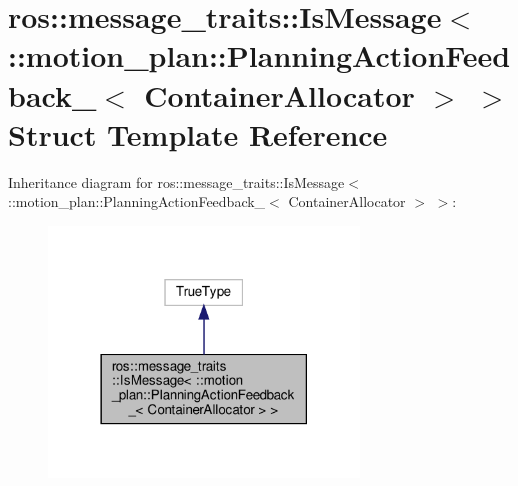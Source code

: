 \hypertarget{structros_1_1message__traits_1_1IsMessage_3_01_1_1motion__plan_1_1PlanningActionFeedback___3_01ContainerAllocator_01_4_01_4}{}\section{ros\+:\+:message\+\_\+traits\+:\+:Is\+Message$<$ \+:\+:motion\+\_\+plan\+:\+:Planning\+Action\+Feedback\+\_\+$<$ Container\+Allocator $>$ $>$ Struct Template Reference}
\label{structros_1_1message__traits_1_1IsMessage_3_01_1_1motion__plan_1_1PlanningActionFeedback___3_01ContainerAllocator_01_4_01_4}


Inheritance diagram for ros\+:\+:message\+\_\+traits\+:\+:Is\+Message$<$ \+:\+:motion\+\_\+plan\+:\+:Planning\+Action\+Feedback\+\_\+$<$ Container\+Allocator $>$ $>$\+:
\nopagebreak
\begin{figure}[H]
\begin{center}
\leavevmode
\includegraphics[width=234pt]{structros_1_1message__traits_1_1IsMessage_3_01_1_1motion__plan_1_1PlanningActionFeedback___3_01Ca1a41cd4ddc46250aea643af33895b6f}
\end{center}
\end{figure}


